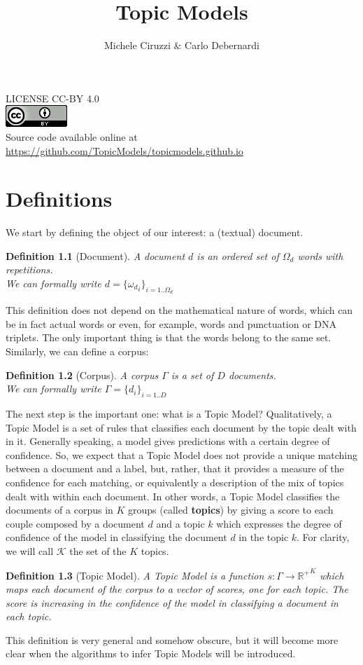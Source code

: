 \documentclass[11pt, a4paper, oneside, openright]{book}
\title{Topic Models}
\author{Michele Ciruzzi \& Carlo Debernardi}
\newtheorem{definition}{Definition}
\begin{document}
\maketitle

LICENSE CC-BY 4.0 \\
\includegraphics{fig/cc-by} \\
Source code available online at \url{https://github.com/TopicModels/topicmodels.github.io}
\clearpage

\tableofcontents

\chapter{Definitions}

We start by defining the object of our interest: a (textual) document.
\begin{definition}[Document]
	\label{def:doc}
	A document $d$ is an ordered set of $\Omega_d$ words with repetitions. \\
	We can formally write $d = \{{\omega_d}_i\}_{i=1..\Omega_d}$
\end{definition}
This definition does not depend on the mathematical nature of words, which can be in fact actual words or even, for example, words and punctuation or DNA triplets. The only important thing is that the words belong to the same set. \\
Similarly, we can define a corpus:
\begin{definition}[Corpus]
	A corpus $\Gamma$ is a set of $D$ documents. \\
	We can formally write $\Gamma = \{d_i\}_{i=1..D}$
\end{definition}

The next step is the important one: what is a Topic Model?
Qualitatively, a Topic Model is a set of rules that classifies each document by the topic dealt with in it.
Generally speaking, a model gives predictions with a certain degree of confidence. 
So, we expect that a Topic Model does not provide a unique matching between a document and a label, but, rather, that it provides a measure of the confidence for each matching, or equivalently a description of the mix of topics dealt with within each document.
In other words, a Topic Model classifies the documents of a corpus in $K$ groups (called \textbf{topics}) by giving a score to each couple composed by a document $d$ and a topic $k$ which expresses the degree of confidence of the model in classifying the document $d$ in the topic $k$.
For clarity, we will call $\mathcal{K}$ the set of the $K$ topics.
\begin{definition}[Topic Model]
	\label{def:tm}
	A Topic Model is a function $s: \Gamma \rightarrow {\mathbb{R}^+}^K$ which maps each document of the corpus to a vector of scores, one for each topic. The score is increasing in the confidence of the model in classifying a document in each topic.
\end{definition}
This definition is very general and somehow obscure, but it will become more clear when the algorithms to infer Topic Models will be introduced.
\end{document}
